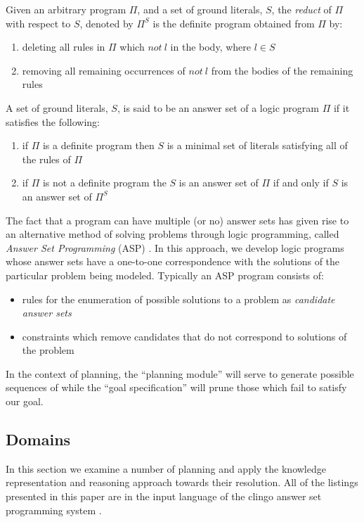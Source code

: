 \documentclass{article}
\begin{document}
Given an arbitrary program $\Pi$, and a set of ground literals, $S$, the \emph{reduct} of $\Pi$ with respect to $S$, denoted by $\Pi^{S}$ is the definite program obtained from $\Pi$ by:
\begin{enumerate}
    \item deleting all rules in $\Pi$ which $not \: l$ in the body, where $l \in S$
    \item removing all remaining occurrences of $not \: l$ from the bodies of the remaining rules
\end{enumerate}
A set of ground literals, $S$, is said to be an answer set of a logic program $\Pi$ if it satisfies the following:
\begin{enumerate}
    \item if $\Pi$ is a definite program then $S$ is a minimal set of literals satisfying all of the rules of $\Pi$
    \item if $\Pi$ is not a definite program the $S$ is an answer set of $\Pi$ if and only if $S$ is an answer set of $\Pi^{S}$
\end{enumerate}

The fact that a program can have multiple (or no) answer sets has given rise to an alternative method of solving problems through logic programming, called \emph{Answer Set Programming} (ASP) \cite{Marek99,Niemela99}. In this approach, we develop logic programs whose answer sets have a one-to-one correspondence with the solutions of the particular problem being modeled. Typically an ASP program consists of:
\begin{itemize}
    \item rules for the enumeration of possible solutions to a problem as \emph{candidate answer sets}
    \item constraints which remove candidates that do not correspond to solutions of the problem
\end{itemize}
In the context of planning, the ``planning module'' will serve to generate possible sequences of while the ``goal specification'' will prune those which fail to satisfy our goal. 

\subsection{Domains}

In this section we examine a number of planning and apply the knowledge representation and reasoning approach towards their resolution. All of the listings presented in this paper are in the input language of the clingo answer set programming system \cite{clingo}.
\end{document}

